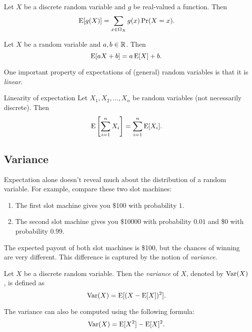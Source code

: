 \documentclass{article}
\begin{document}
\begin{proposition}
  Let $X$ be a discrete random variable and $g$ be real-valued a function.
  Then
  \[
    \operatorname{E}[g(X)] = \sum_{x \in \Omega_X} g(x) \Pr(X = x).
  \]
\end{proposition}

\begin{corollary}
  Let $X$ be a random variable and $a, b \in \mathbb{R}$.
  Then
  \[
    \operatorname{E}[a X + b] = a \operatorname{E}[X] + b.
  \]
\end{corollary}

One important property of expectations of (general) random variables is that it is \emph{linear}.

\begin{theorem}{Linearity of expectation}
  Let $X_1, X_2, \ldots, X_n$ be random variables (not necessarily discrete).
  Then
  \[
    \operatorname{E}\left[\sum\limits_{i = 1}^n X_i\right] = \sum\limits_{i = 1}^n \operatorname{E}[X_i].
  \]
\end{theorem}

\subsection{Variance}

Expectation alone doesn't reveal much about the distribution of a random variable.
For example, compare these two slot machines:
\begin{enumerate}
  \item The first slot machine gives you \$100 with probability $1$.
  \item The second slot machine gives you \$10000 with probability $0.01$ and \$0 with probability $0.99$.
\end{enumerate}
The expected payout of both slot machines is \$100, but the chances of winning are very different.
This difference is captured by the notion of \emph{variance}.

\begin{definition}
  Let $X$ be a discrete random variable.
  Then the \emph{variance} of $X$, denoted by $\operatorname{Var}(X)$, is defined as
  \[
    \operatorname{Var}(X) = \operatorname{E}[(X - \operatorname{E}[X])^2].
  \]
\end{definition}

\begin{remark}
  The variance can also be computed using the following formula:
  \[
    \operatorname{Var}(X) = \operatorname{E}[X^2] - \operatorname{E}[X]^2.
  \]
\end{remark}
\end{document}
